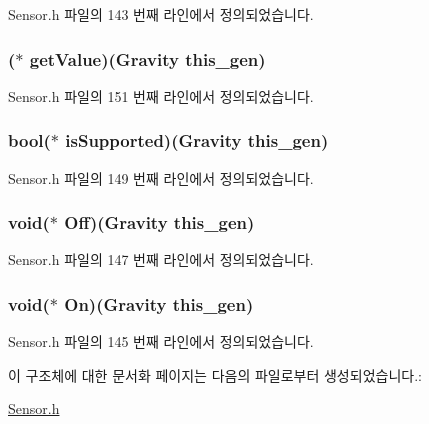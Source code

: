 Sensor.\-h 파일의 143 번째 라인에서 정의되었습니다.

\hypertarget{struct___gravity_afe837cce5c4d493eb3b48a65261d000d}{
\subsubsection[{get\-Value}]{($\ast$  get\-Value)({\bf Gravity} this\-\_\-gen)}}\label{struct___gravity_afe837cce5c4d493eb3b48a65261d000d}


Sensor.\-h 파일의 151 번째 라인에서 정의되었습니다.

\hypertarget{struct___gravity_a64d7cabe8a37fd627a0fa93af3372ec6}{
\subsubsection[{is\-Supported}]{\setlength{\rightskip}{0pt plus 5cm}bool($\ast$  is\-Supported)({\bf Gravity} this\-\_\-gen)}}\label{struct___gravity_a64d7cabe8a37fd627a0fa93af3372ec6}


Sensor.\-h 파일의 149 번째 라인에서 정의되었습니다.

\hypertarget{struct___gravity_a00ad5bd0e2b545812fceaaed88c0c48b}{
\subsubsection[{Off}]{\setlength{\rightskip}{0pt plus 5cm}void($\ast$  Off)({\bf Gravity} this\-\_\-gen)}}\label{struct___gravity_a00ad5bd0e2b545812fceaaed88c0c48b}


Sensor.\-h 파일의 147 번째 라인에서 정의되었습니다.

\hypertarget{struct___gravity_a84c1b656c2161ac6e65f9d65ef3a71d6}{
\subsubsection[{On}]{\setlength{\rightskip}{0pt plus 5cm}void($\ast$  On)({\bf Gravity} this\-\_\-gen)}}\label{struct___gravity_a84c1b656c2161ac6e65f9d65ef3a71d6}


Sensor.\-h 파일의 145 번째 라인에서 정의되었습니다.



이 구조체에 대한 문서화 페이지는 다음의 파일로부터 생성되었습니다.\-:\begin{DoxyCompactItemize}
\item 
\hyperlink{_sensor_8h}{Sensor.\-h}\end{DoxyCompactItemize}
